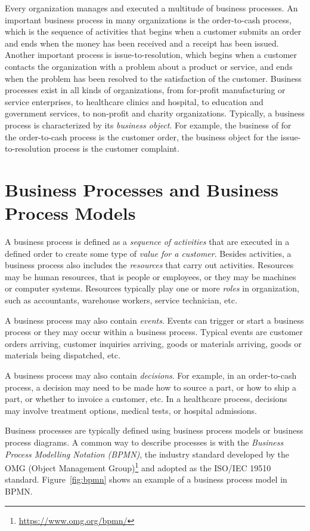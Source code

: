 Every organization manages and executed a multitude of business processes. An important business process in many organizations is the order-to-cash process, which is the sequence of activities that begins when a customer submits an order and ends when the money has been received and a receipt has been issued. Another important process is issue-to-resolution, which begins when a customer contacts the organization with a problem about a product or service, and ends when the problem has been resolved to the satisfaction of the customer. Business processes exist in all kinds of organizations, from for-profit manufacturing or service enterprises, to healthcare clinics and hospital, to education and government services, to non-profit and charity organizations. Typically, a business process is characterized by its \emph{business object}. For example, the business of for the order-to-cash process is the customer order, the business object for the issue-to-resolution process is the customer complaint.

\section{Business Processes and Business Process Models}

A business process is defined as a \emph{sequence of activities} that are executed in a defined order to create some type of \emph{value for a customer}. Besides activities, a business process also includes the \emph{resources} that carry out activities. Resources may be human resources, that is people or employees, or they may be machines or computer systems. Resources typically play one or more \emph{roles} in organization, such as accountants, warehouse workers, service technician, etc.

A business process may also contain \emph{events}. Events can trigger or start a business process or they may occur within a business process. Typical events are customer orders arriving, customer inquiries arriving, goods or materials arriving, goods or materials being dispatched, etc. 

A business process may also contain \emph{decisions}. For example, in an order-to-cash process, a decision may need to be made how to source a part, or how to ship a part, or whether to invoice a customer, etc. In a healthcare process, decisions may involve treatment options, medical tests, or hospital admissions.

Business processes are typically defined using business process models or business process diagrams. A common way to describe processes is with the \emph{Business Process Modelling Notation (BPMN)}, the industry standard developed by the OMG (Object Management Group)\footnote{\url{https://www.omg.org/bpmn/}} and adopted as the ISO/IEC 19510 standard. Figure~\ref{fig:bpmn} shows an example of a business process model in BPMN.

